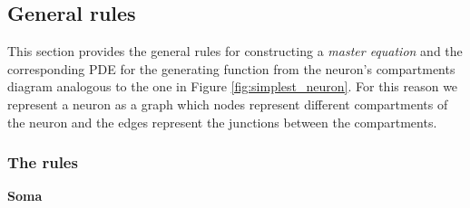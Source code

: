 \documentclass[a4paper, 11pt]{article}
\begin{document}


\subsection{General rules}\label{subsec:rules}
This section provides the general rules for constructing a {\it master equation} and the corresponding PDE for the generating function from the neuron's compartments diagram analogous to the one in Figure \ref{fig:simplest_neuron}. For this reason we represent a neuron as a graph which nodes represent different compartments of the neuron and the edges represent the junctions between the compartments.

\subsubsection{The rules}
              {\bf Soma}
              
\end{document}
